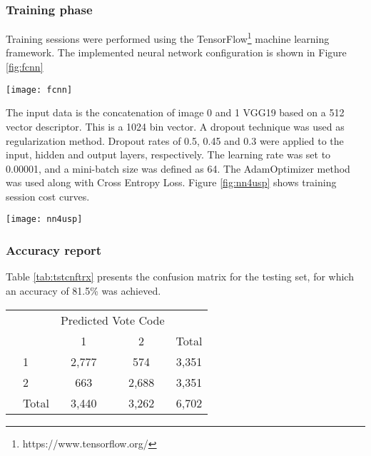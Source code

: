\documentclass{llncs}
\begin{document}
\subsubsection{Training phase}
Training sessions were performed using the TensorFlow\footnote{https://www.tensorflow.org/} machine learning framework. The implemented neural network configuration is shown in Figure \ref{fig:fcnn}

\begin{center}
	\centering
	\texttt{[image: fcnn]}
	\label{fig:fcnn}
\end{center}

The input data is the concatenation of image 0 and 1 VGG19 based on a 512 vector descriptor. This is a 1024 bin vector. A dropout technique was used as regularization method. Dropout rates of 0.5, 0.45 and 0.3 were applied to the input, hidden and output layers, respectively. The learning rate was set to 0.00001, and a mini-batch size was defined as 64. The AdamOptimizer \cite{DBLP:journals/corr/KingmaB14} method was used along with Cross Entropy Loss. Figure \ref{fig:nn4usp} shows training session cost curves.

\begin{center}
	\centering
	\texttt{[image: nn4usp]}
	\label{fig:nn4usp}
\end{center}

\subsubsection{Accuracy report}
Table \ref{tab:tstcnftrx} presents the confusion matrix for the testing set, for which an accuracy of 81.5\% was achieved.


\begin{center}
	 \label{tab:tstcnftrx} 
	\begin{tabular}{l|l|c|c|c}
		\multicolumn{2}{c}{}&\multicolumn{2}{c}{Predicted Vote Code}&\\
		\cline{3-4}
		\multicolumn{2}{c|}{}&1&2&\multicolumn{1}{c}{Total}\\
		\cline{2-4}
		& 1 & 2,777 & 574& 3,351\\
		\cline{2-4}
		& 2 & 663 & 2,688 & 3,351\\
		\cline{2-4}
		\multicolumn{1}{c}{} & \multicolumn{1}{c}{Total} & \multicolumn{1}{c}{3,440} & \multicolumn{    1}{c}{3,262} & \multicolumn{1}{c}{6,702}\\
	\end{tabular}
	
\end{center}
\end{document}
